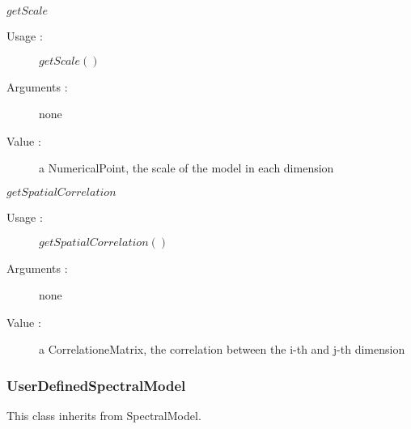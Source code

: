 \begin{description}
\begin{description}
    \item $getScale$
    \begin{description}
    \item[Usage :] $getScale()$
    \item[Arguments :] none
    \item[Value :]   a NumericalPoint, the scale of the model in each dimension
    \end{description}
    \bigskip

     \item $getSpatialCorrelation$
    \begin{description}
    \item[Usage :] $getSpatialCorrelation()$
    \item[Arguments :] none
    \item[Value :]   a CorrelationeMatrix, the correlation between the i-th and j-th dimension
    \end{description}
    \bigskip


  \end{description}

\end{description}


\newpage \subsubsection{UserDefinedSpectralModel}
This class inherits from SpectralModel.\\

